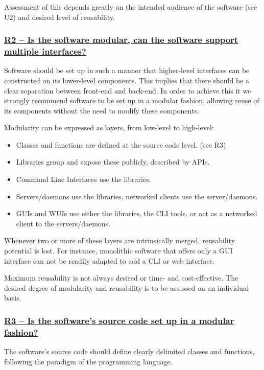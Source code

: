 \documentclass[a4paper,11pt]{article}
\newcommand{\indicator}[1]{\subsubsection*{\underline{#1}}}
\begin{document}
Assessment of this depends greatly on the intended audience of the software
(see U2) and desired level of reusability.

\indicator{R2 -- Is the software modular, can the software support multiple interfaces?}

Software should be set up in such a manner that higher-level interfaces can be
constructed on its lower-level components. This implies that there should be a
clear separation between front-end and back-end. In order to achieve this it we
strongly recommend software to be set up in a modular fashion, allowing reuse
of its components without the need to modify these components.

Modularity can be expressed as layers, from low-level to high-level:

\begin{itemize}
 \item Classes and functions are defined at the source code level. (see R3)
 \item Libraries group and expose these publicly, described by APIs. 
 \item Command Line Interfaces use the libraries.
 \item Servers/daemons use the libraries, networked clients use the server/daemons.
 \item GUIs and WUIs use either the libraries, the CLI tools, or act as a networked client to the servers/daemons.
\end{itemize}

Whenever two or more of these layers are intrinsically merged, reusability potential is lost.
For instance, monolithic software that offers only a GUI interface can not be
readily adapted to add a CLI or web interface.

Maximum reusability is not always desired or time- and cost-effective. The
desired degree of modularity and reusability is to be assessed on an
individual basis.

\indicator{R3 -- Is the software's source code set up in a modular fashion?}
%
%
%

The software's source code should define clearly delimited classes and
functions, following the paradigm of the programming language. 
\end{document}
